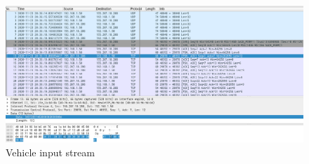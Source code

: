 \documentclass[12pt, a4paper]{article}
\begin{document}
\pagebreak

\begin{figure}[h!]
\centering
	\includegraphics[height=.4\textheight, width=\textwidth, keepaspectratio]{assets/wireshark/vehicle4.png}
	\caption{Vehicle input stream} 
\end{figure}
\end{document}
